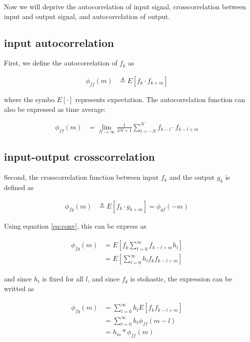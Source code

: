 \documentclass[8pt,a4paper]{article}
\begin{document}
\begin{multicols}{2}
Now we will deprive the autocorrelation of input signal, crosscorrelation between input and output signal, and autocorrelation of output. 

\subsection*{input autocorrelation}
First, we define the autocorrelation of $f_{k}$ as

\begin{align}
  \phi_{ff}(m) &\triangleq E \left[ f_{k} \cdot f_{k+m} \right]
\end{align}

where the symbo $E[\cdot]$ represents expectation. The autocorrelation function can also be expressed as time average:

\begin{align}
  \phi_{ff}(m) &= \lim_{N\rightarrow\infty} \frac{1}{2N+1} \sum_{l=-N}^{N} f_{k-l} \cdot f_{k-l+m}
\end{align}

\subsection*{input-output crosscorrelation}

Second, the crosscorrelation function between input $f_{k}$ and the output $g_{k}$ is defined as


\begin{align}
  \phi_{fg}(m) &\triangleq E \left[ f_{k} \cdot g_{k+m} \right] = \phi_{gf}(-m)
\end{align}

Using equation \ref{eq:conv}, this can be express as

\begin{align}
  \begin{split}
    \phi_{fg}(m) &= E \left[ f_{k} \sum_{t=0}^{\infty} f_{k-l+m}h_{l} \right]\\
    &= E \left[ \sum_{l=0}^{\infty} h_{l} f_{k} f_{k-l+m} \right]
  \end{split}
\end{align}

and since $h_{t}$ is fixed for all $ l $, and since $f_{k}$ is stohastic, the expression can be writted as

\begin{align}
  \label{eq:input_output_crosscorrelation}
  \begin{split}
    \phi_{fg}(m) &= \sum_{l=0}^{\infty} h_{l} E \left[ f_{k} f_{k-l+m} \right] \\
    &= \sum_{l=0}^{\infty} h_{l} \phi_{ff}(m-l) \\
    &= h_{m} * \phi_{ff}(m)
  \end{split}
\end{align}


\end{multicols}
\end{document}
